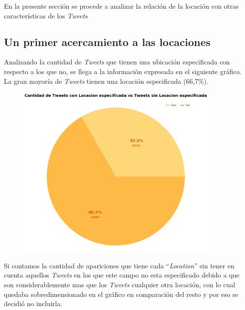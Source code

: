 \documentclass[titlepage,a4paper]{article}
\begin{document}
    En la presente sección se procede a analizar la relación de la locación con otras características de los \textit{Tweets}  
    
    \subsection{Un primer acercamiento a las locaciones}
    
    
    Analizando la cantidad de \textit{Tweets} que tienen una ubicación especificada con respecto a los que no, se llega a la información expresada en el siguiente gráfico. La gran mayoría de \textit{Tweets} tienen una locación especificada (66,7\%).
    
    \begin{figure}[H]
    \centering
    \includegraphics[width=0.9\textwidth]{graficos/Analisis de Locacion/cantidad_de_tweets_con_locacion_especificada_vs_sin_locacion_especificada.png}
    \caption{} 
    \end{figure}
    
    Si contamos la cantidad de apariciones que tiene cada ``\textit{Location}'' sin tener en cuenta aquellos \textit{Tweets} en los que este campo no esta especificado debido a que son considerablemente mas que los \textit{Tweets} cualquier otra locación, con lo cual quedaba sobredimensionado en el gráfico en comparación del resto y por eso se decidió no incluirla.
\end{document}
